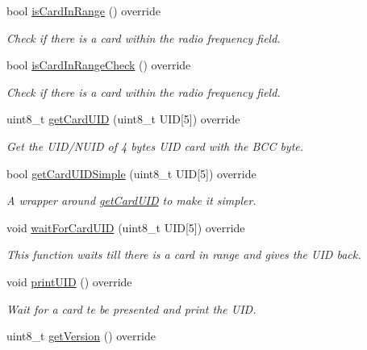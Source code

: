 \begin{DoxyCompactItemize}
bool \mbox{\hyperlink{class_m_f_r_c522_a019f76569bddf9c2f9f94eca13a618d7}{is\+Card\+In\+Range}} () override
\begin{DoxyCompactList}\small\item\em Check if there is a card within the radio frequency field. \end{DoxyCompactList}\item 
bool \mbox{\hyperlink{class_m_f_r_c522_a29ce0dd04495f9352e32ada5ecc5fd03}{is\+Card\+In\+Range\+Check}} () override
\begin{DoxyCompactList}\small\item\em Check if there is a card within the radio frequency field. \end{DoxyCompactList}\item 
uint8\+\_\+t \mbox{\hyperlink{class_m_f_r_c522_ad3c7ab4c70988e80c400f36f724a12b7}{get\+Card\+U\+ID}} (uint8\+\_\+t U\+ID\mbox{[}5\mbox{]}) override
\begin{DoxyCompactList}\small\item\em Get the U\+I\+D/\+N\+U\+ID of 4 bytes U\+ID card with the B\+CC byte. \end{DoxyCompactList}\item 
bool \mbox{\hyperlink{class_m_f_r_c522_a33c20be6030f635d986984db4999a1eb}{get\+Card\+U\+I\+D\+Simple}} (uint8\+\_\+t U\+ID\mbox{[}5\mbox{]}) override
\begin{DoxyCompactList}\small\item\em A wrapper around \mbox{\hyperlink{class_m_f_r_c522_ad3c7ab4c70988e80c400f36f724a12b7}{get\+Card\+U\+ID}} to make it simpler. \end{DoxyCompactList}\item 
void \mbox{\hyperlink{class_m_f_r_c522_aeb05c83c2d139eb2c57f400399982691}{wait\+For\+Card\+U\+ID}} (uint8\+\_\+t U\+ID\mbox{[}5\mbox{]}) override
\begin{DoxyCompactList}\small\item\em This function waits till there is a card in range and gives the U\+ID back. \end{DoxyCompactList}\item 
void \mbox{\hyperlink{class_m_f_r_c522_aee85264d7411b76a3b0817622b428827}{print\+U\+ID}} () override
\begin{DoxyCompactList}\small\item\em Wait for a card te be presented and print the U\+ID. \end{DoxyCompactList}\item 
uint8\+\_\+t \mbox{\hyperlink{class_m_f_r_c522_a25fb0a50bf7db51ab9c5bc2ff4fa84e3}{get\+Version}} () override

\end{DoxyCompactItemize}

